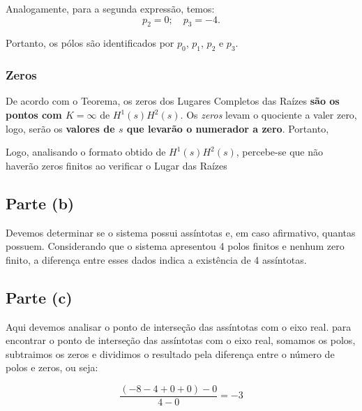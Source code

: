 \documentclass[a4paper, 12pt]{article}
\begin{document}
Analogamente, para a segunda expressão, temos:
\begin{equation}\label{eq:polos2}
    p_{2}=0; \quad p_{3}=-4.
\end{equation}

Portanto, os pólos são identificados por $p_{0}$, $p_{1}$, $p_{2}$ e $p_{3}$. \blacksquare



\subsubsection{Zeros}
De acordo com o Teorema, os zeros dos Lugares Completos das Raízes \textbf{são os pontos com $K = \infty$} de $H^1(s)H^2(s)$. Os \textit{zeros} levam o quociente a valer zero, logo, serão os \textbf{valores de $s$ que levarão o numerador a zero}. Portanto,

Logo, analisando o formato obtido de $H^1(s)H^2(s)$, percebe-se que não haverão zeros finitos ao verificar o Lugar das Raízes \blacksquare



\subsection{Parte (b)}
Devemos determinar se o sistema possui assíntotas e, em caso afirmativo, quantas possuem. Considerando que o sistema apresentou 4 polos finitos e nenhum zero finito, a diferença entre esses dados indica a existência de 4 assíntotas.

\subsection{Parte (c)}
Aqui devemos analisar o ponto de interseção das assíntotas com o eixo real. para encontrar o ponto de interseção das assíntotas com o eixo real, somamos os polos, subtraimos os zeros e dividimos o resultado pela diferença entre o número de polos e zeros, ou seja: 

\begin{equation}\label{eq: root_locus_assymptote_intersection}
    \frac{(-8 -4 + 0 + 0) - 0}{4 - 0} = -3
\end{equation}
\end{document}

